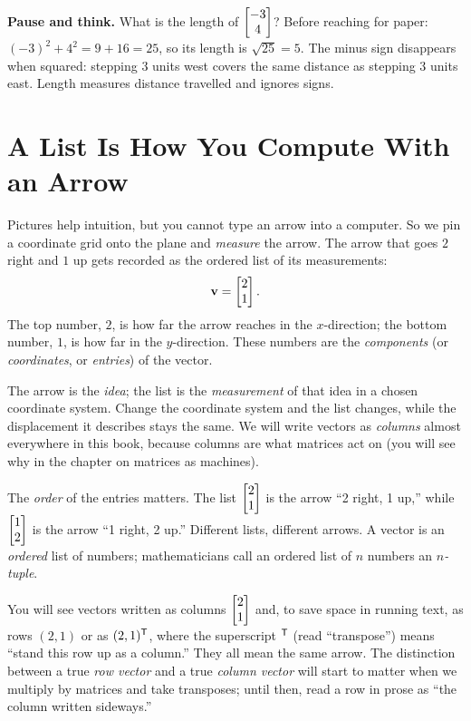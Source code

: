 \begin{recoverybox}
\textbf{Pause and think.} What is the length of $\begin{bmatrix}-3\\4\end{bmatrix}$? Before reaching for
paper: $(-3)^2 + 4^2 = 9 + 16 = 25$, so its length is $\sqrt{25} = 5$. The minus sign
disappears when squared: stepping $3$ units west covers the same distance as stepping $3$
units east. Length measures distance travelled and ignores signs.
\end{recoverybox}

\section{A List Is How You Compute With an Arrow}
\label{ch02:list}

Pictures help intuition, but you cannot type an arrow into a computer. So we
pin a coordinate grid onto the plane and \emph{measure} the arrow. The arrow that goes
$2$ right and $1$ up gets recorded as the ordered list of its measurements:
\[
  \mathbf{v} = \begin{bmatrix}2 \\ 1\end{bmatrix}.
\]
The top number, $2$, is how far the arrow reaches in the $x$-direction; the bottom
number, $1$, is how far in the $y$-direction. These numbers are the \emph{components} (or
\emph{coordinates}, or \emph{entries}) of the vector.

\begin{focusbox}
The arrow is the \emph{idea}; the list is the \emph{measurement} of that idea in a chosen
coordinate system. Change the coordinate system and the list changes, while the
displacement it describes stays the same. We will write vectors as \emph{columns} almost
everywhere in this book, because columns are what matrices act on (you will see why in
the chapter on matrices as machines).
\end{focusbox}

The \emph{order} of the entries matters. The list $\begin{bmatrix}2 \\ 1\end{bmatrix}$ is
the arrow ``2 right, 1 up,'' while $\begin{bmatrix}1 \\ 2\end{bmatrix}$ is the arrow ``1 right, 2 up.''
Different lists, different arrows. A vector is an \emph{ordered} list of numbers;
mathematicians call an ordered list of $n$ numbers an \emph{$n$-tuple}.

\begin{remark}
You will see vectors written as columns $\begin{bmatrix}2 \\ 1\end{bmatrix}$ and, to save space in running
text, as rows $(2,1)$ or as $(2,1)^{\mathsf{T}}$, where the superscript $^{\mathsf{T}}$ (read ``transpose'')
means ``stand this row up as a column.'' They all mean the same arrow. The
distinction between a true \emph{row vector} and a true \emph{column vector} will
start to matter when we multiply by matrices and take transposes; until then, read a row
in prose as ``the column written sideways.''
\end{remark}

